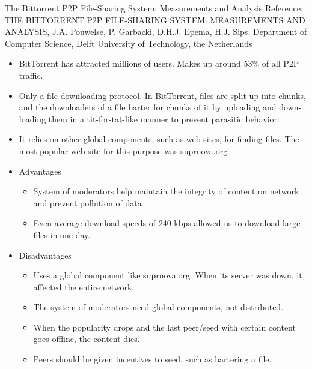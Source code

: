 \documentclass[9pt]{beamer}
\begin{document}
\begin{frame}{The Bittorrent P2P File-Sharing System: Measurements and Analysis}
    \small Reference: THE BITTORRENT P2P FILE-SHARING SYSTEM: MEASUREMENTS AND ANALYSIS, J.A. Pouwelse, P. Garbacki, D.H.J. Epema, H.J. Sips, Department of Computer Science, Delft University of Technology, the Netherlands
    \break
    \begin{itemize}
        \item BitTorrent has attracted millions of users. Makes up around 53\% of all P2P traffic.
        \item Only a file-downloading protocol. In BitTorrent, ﬁles are split up into chunks, and the downloaders of a ﬁle barter for chunks of it by uploading and down-loading them in a tit-for-tat-like manner to prevent parasitic behavior. 
        \item It relies on other global components, such as web sites, for ﬁnding ﬁles. The most popular web site for this purpose was suprnova.org
    \end{itemize}
\end{frame}
\begin{frame}{}
\begin{itemize}    
    \item Advantages
        \begin{itemize}
            \item System of moderators help maintain the integrity of content on network and prevent pollution of data
\item Even average download speeds of 240 kbps allowed us to download large files in one day. 

        \end{itemize}
        \item Disadvantages
        \begin{itemize}
            \item Uses a global component like suprnova.org. When its server was down, it affected the entire network.
\item The system of moderators need global components, not distributed. 
\item When the popularity drops and the last peer/seed with certain content goes offline, the content dies. 
\item Peers should be given incentives to seed, such as bartering a file.

        \end{itemize}
    \end{itemize}
\end{frame}
\end{document}
